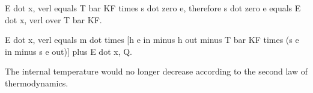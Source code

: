 E dot x, verl equals T bar KF times s dot zero e, therefore s dot zero e equals E dot x, verl over T bar KF.

E dot x, verl equals m dot times [h e in minus h out minus T bar KF times (s e in minus s e out)] plus E dot x, Q.

The internal temperature would no longer decrease according to the second law of thermodynamics.